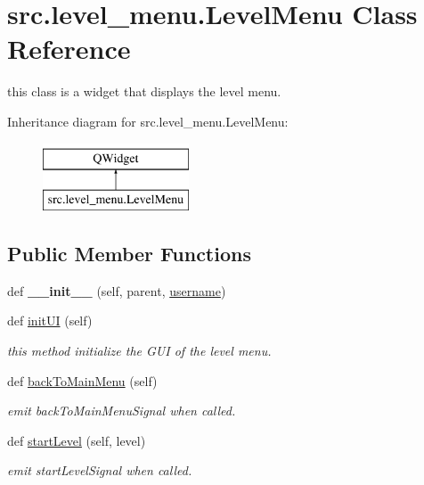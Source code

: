 \hypertarget{classsrc_1_1level__menu_1_1_level_menu}{}\section{src.\+level\+\_\+menu.\+Level\+Menu Class Reference}
\label{classsrc_1_1level__menu_1_1_level_menu}


this class is a widget that displays the level menu.  


Inheritance diagram for src.\+level\+\_\+menu.\+Level\+Menu\+:\begin{figure}[H]
\begin{center}
\leavevmode
\includegraphics[height=2.000000cm]{classsrc_1_1level__menu_1_1_level_menu}
\end{center}
\end{figure}
\subsection*{Public Member Functions}
\begin{DoxyCompactItemize}
\item 
\hypertarget{classsrc_1_1level__menu_1_1_level_menu_a39fd7912eb9a473b0fb03b5ae1bd0d84}{}def {\bfseries \+\_\+\+\_\+init\+\_\+\+\_\+} (self, parent, \hyperlink{classsrc_1_1level__menu_1_1_level_menu_aee1d2148e23a2908c72c4a8f8ad0a98f}{username})\label{classsrc_1_1level__menu_1_1_level_menu_a39fd7912eb9a473b0fb03b5ae1bd0d84}

\item 
def \hyperlink{classsrc_1_1level__menu_1_1_level_menu_a85ba6c3a92e1f256f70186866f2795ac}{init\+U\+I} (self)
\begin{DoxyCompactList}\small\item\em this method initialize the G\+U\+I of the level menu. \end{DoxyCompactList}\item 
def \hyperlink{classsrc_1_1level__menu_1_1_level_menu_a5852c765b18d5e6c28d5fdb7ebf80427}{back\+To\+Main\+Menu} (self)
\begin{DoxyCompactList}\small\item\em emit back\+To\+Main\+Menu\+Signal when called. \end{DoxyCompactList}\item 
def \hyperlink{classsrc_1_1level__menu_1_1_level_menu_aafc4b32a91edcdf2a10f5de32efbda2a}{start\+Level} (self, level)
\begin{DoxyCompactList}\small\item\em emit start\+Level\+Signal when called. \end{DoxyCompactList}\end{DoxyCompactItemize}
